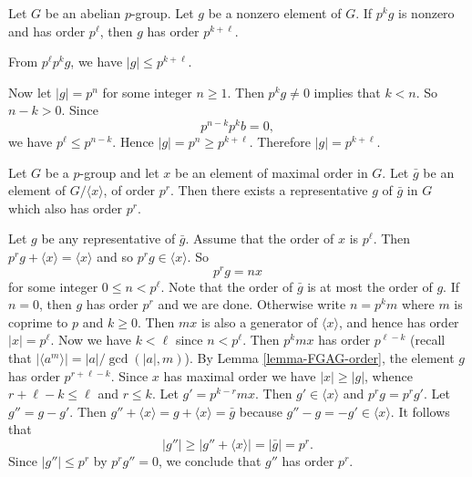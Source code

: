\begin{lemma} \label{lemma-FGAG-order}
	Let $G$ be an abelian $p$-group. Let $g$ be a nonzero element of $G$. If $p^kg$ is nonzero and has order $p^\ell$, then $g$ has order $p^{k+\ell}$.  
\end{lemma}
\begin{sketch}
	From $p^\ell p^kg$, we have $|g|\leq p^{k+\ell}$. 
	
	Now let $|g| = p^n$ for some integer $n\geq 1$. Then $p^k g\neq 0$ implies that $k< n$. So $n-k > 0$. Since
	\begin{equation*}
		p^{n-k}p^k b  = 0,
	\end{equation*}
	we have $p^\ell \leq p^{n-k}$. Hence $|g|  = p^n \geq p^{k+\ell}$. Therefore $|g|  =  p^{k+\ell}$.
\end{sketch}




\begin{lemma} \label{lemma-FGAG-order-represent}
	Let $G$ be a $p$-group and let $x$ be an element of maximal order in $G$. Let $\bar{g}$ be an element of $G/\langle x \rangle$, of order $p^r$. Then there exists a representative $g$ of $\bar{g}$ in $G$ which also has order $p^r$.
\end{lemma}
\begin{sketch}
	Let $g$ be any representative of $\bar{g}$. Assume that the order of $x$ is $p^\ell$. Then $p^rg+ \langle x \rangle = \langle x \rangle$ and so $p^rg \in \langle x \rangle$. So $$p^r g = nx$$ for some integer $0\leq n < p^{\ell}$. Note that the order of $\bar{g}$ is at most the order of $g$. If $n=0$, then $g$ has order $p^r$ and we are done. Otherwise write $n = p^k m$ where $m$ is coprime to $p$ and $k\geq 0$. Then $m x$ is also a generator of $\langle x \rangle$, and hence has order $|x| = p^{\ell}$.  Now we have $k <  \ell$ since $n<p^\ell$. Then $p^k m x$ has order $p^{\ell-k}$ (recall that $|\langle a^m \rangle| = |a|/\gcd(|a|,m)$). By Lemma \ref{lemma-FGAG-order}, the element $g$ has order $ p^{r+\ell-k} $. Since $x$ has maximal order we have $|x|\geq |g|$, whence $r+\ell-k \le \ell$ and $r \le k$. Let $g'= p^{k-r}mx$. Then   $g' \in \langle x \rangle$ and $p^r g = p^r g'$. Let $g'' = g-g'$. Then $g''+\langle x \rangle = g+\langle x \rangle = \bar{g}$ because $g''-g = -g'\in \langle x \rangle$. It follows that $$|g''|\geq |g''+\langle x \rangle|= |\bar{g}| = p^r.$$ Since $|g''| \le p^r$ by $p^rg'' = 0$,  we conclude that $g''$ has order  $p^r$.
\end{sketch}

